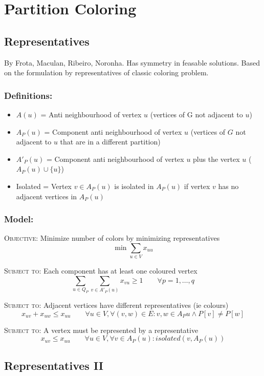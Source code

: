\documentclass[a4paper]{article}
\newenvironment{lpmodel}{\subsubsection*{Model:} }{ }
\newcommand{\lpobjective}[2]{\textsc{Objective:} #1 \[ #2 \]}
\newcommand{\lprestriction}[3]{\textsc{Subject to:} #1 \[ #2 \qquad #3 \]}
\begin{document}
\section{Partition Coloring}

\subsection{Representatives}

By Frota, Maculan, Ribeiro, Noronha. Has symmetry in feasable solutions. Based on the formulation by representatives of classic coloring problem.

\subsubsection*{Definitions:}

\begin{itemize}
\item{$A(u)$ = Anti neighbourhood of vertex $u$ (vertices of G not adjacent to $u$)}
\item{$A_P(u)$ = Component anti neighbourhood of vertex $u$ (vertices of $G$ not adjacent to $u$ that are in a different partition)}
\item{$A'_P(u)$ = Component anti neighbourhood of vertex $u$ plus the vertex $u$ ($A_P(u) \cup \{u\}$)}
\item{Isolated = Vertex $v \in A_P(u)$ is isolated in $A_P(u)$ if vertex $v$ has no adjacent vertices in $A_P(u)$}
\end{itemize}

\begin{lpmodel}

\lpobjective{Minimize number of colors by minimizing representatives}
{\min \sum_{u \in V} x_{uu}}

\lprestriction{Each component has at least one coloured vertex}
{\sum_{u \in Q_P} \sum_{v \in A'_P(u)} x_{vu} \geq 1}{\forall p = 1,\ldots,q}

\lprestriction{Adjacent vertices have different representatives (ie colours)}
{x_{uv} + x_{uw} \leq x_{uu}}{\forall u \in V, \forall (v,w) \in E : v,w \in A_P{u} \wedge P[v] \neq P[w]}

\lprestriction{A vertex must be represented by a representative}
{x_{uv} \leq x_{uu}}{\forall u \in V, \forall v \in A_P(u) : isolated(v, A_P(u))}

\end{lpmodel}

\subsection{Representatives II}
\end{document}
